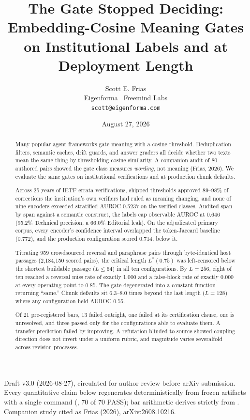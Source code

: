 \documentclass[11pt]{article}
\title{The Gate Stopped Deciding: Embedding-Cosine Meaning Gates on Institutional Labels and at Deployment Length}
\author{Scott E. Frias\\ Eigenforma \textperiodcentered\ Freemind Labs\\ \texttt{scott@eigenforma.com}}
\date{August 27, 2026}
\begin{document}
\maketitle

\begin{center}
\small Draft v3.0 (2026-08-27), circulated for author review before arXiv submission. Every quantitative claim below regenerates deterministically from frozen artifacts with a single command (, 70 of 70 PASS); bar arithmetic derives strictly from . Companion study cited as Frias (2026), arXiv:2608.10216.
\end{center}

\begin{abstract}
Many popular agent frameworks gate meaning with a cosine threshold. Deduplication filters, semantic caches, drift guards, and answer graders all decide whether two texts mean the same thing by thresholding cosine similarity. A companion audit of 80 authored pairs showed the gate class measures \emph{wording}, not meaning (Frias, 2026). We evaluate the same gates on institutional verifications and at production chunk defaults.

Across 25 years of IETF errata verifications, shipped thresholds approved 89--98\% of corrections the institution's own verifiers had ruled as meaning changing, and none of nine encoders exceeded stratified AUROC 0.5237 on the verified classes. Audited span by span against a semantic construct, the labels cap observable AUROC at 0.646 (95.2\% Technical precision, a 66.0\% Editorial leak). On the adjudicated primary corpus, every encoder's confidence interval overlapped the token-Jaccard baseline (0.772), and the production configuration scored 0.714, below it.

Titrating 959 crowdsourced reversal and paraphrase pairs through byte-identical host passages (2,184,150 scored pairs), the critical length $L^*(0.75)$ was left-censored below the shortest buildable passage ($L \le 64$) in all ten configurations. By $L = 256$, eight of ten reached a reversal miss rate of exactly 1.000 and a false-block rate of exactly 0.000 at every operating point to 0.85. The gate degenerated into a constant function returning ``same.'' Chunk defaults sit 6.3--8.0 times beyond the last length ($L = 128$) where any configuration held AUROC 0.55.

Of 21 pre-registered bars, 13 failed outright, one failed at its certification clause, one is unresolved, and three passed only for the configurations able to evaluate them. A transfer prediction failed by improving. A refutation blinded to source showed coupling direction does not invert under a uniform rubric, and magnitude varies severalfold across revision processes.
\end{abstract}
\end{document}
